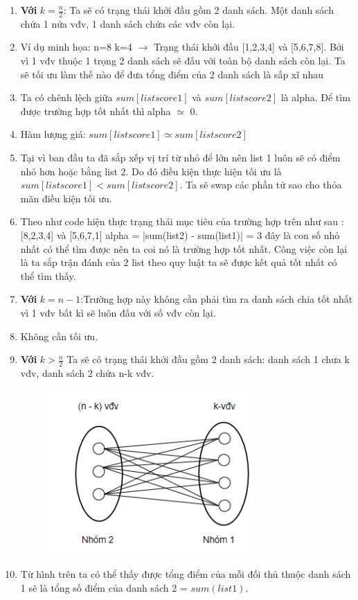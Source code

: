 \documentclass[13pt,a4paper]{article}
\begin{document}
\begin{enumerate}
	\item \textbf{Với} $k = \frac{n}{2}$: Ta sẽ có trạng thái khởi đầu gồm 2 danh sách. Một danh sách chứa 1 nửa vđv, 1 danh sách chứa các vđv còn lại.
	\item[] Ví dụ minh họa: n=8 k=4 $\rightarrow$ Trạng thái khởi đầu [1,2,3,4] và [5,6,7,8]. Bởi vì 1 vđv thuộc 1 trọng 2 danh sách sẽ đấu với toàn bộ danh sách còn lại. Ta sẽ tối ưu làm thế nào để đưa tổng điểm của 2 danh sách là sấp xĩ nhau
	\item[] Ta có chênh lệch giữa $sum[list score 1]$ và $ sum[list score 2]$ là alpha. Để tìm được trường hợp tốt nhất thì alpha $\simeq $ 0.
	\item[] Hàm lượng giá: $sum[list score 1] \simeq sum[list score 2]$
	\item[] Tại vì ban đầu ta đã sắp xếp vị trí từ nhỏ để lớn nên list 1 luôn sẽ có điểm nhỏ hơn hoặc bằng list 2. Do đó điều kiện thực hiện tối ưu là $sum[list score 1] < sum[list score 2]$. Ta sẽ swap các phần tử sao cho thỏa mãn điều kiện tối ưu.
	\item[] Theo như code hiện thực trạng thái mục tiêu của trường hợp trên như sau : [8,2,3,4] và [5,6,7,1] alpha = |sum(list2) - sum(list1)| = 3 đây là con số nhỏ nhất có thể tìm được nên ta coi nó là trường hợp tốt nhất. Công việc còn lại là ta sắp trận đánh của 2 list theo quy luật ta sẽ được kết quả tốt nhất có thể tìm thấy.
	
	\item \textbf{Với} $k =n-1 $:Trường hợp này không cần phải tìm ra danh sách chia tốt nhất vì 1 vđv bất kì sẽ luôn đấu với số vđv còn lại.
	\item[] Không cần tối ưu.
	
	\newpage
	\item \textbf{Với} $k > \frac{n}{2}$ Ta sẽ có trạng thái khởi đầu gồm 2 danh sách: danh sách 1 chưa k vđv, danh sách 2 chứa n-k vđv.
	\begin{figure}[H]
		\centering
		\includegraphics[scale=0.7]{./image/hinh3.png}
	\end{figure}
	\item[] Từ hình trên ta có thể thấy được tổng điểm của mỗi đối thủ thuộc danh sách 1 sẽ là tổng số điểm của danh sách 2 = $sum(list1)$. 
	

\end{enumerate}
\end{document}

